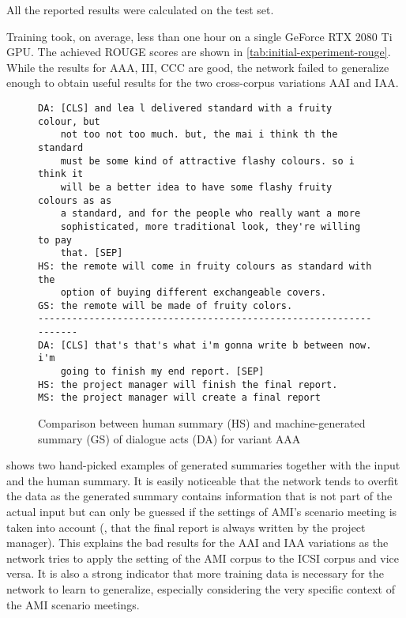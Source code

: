 All the reported results were calculated on the test set.

Training took, on average, less than one hour on a single GeForce RTX 2080 Ti GPU.
The achieved ROUGE scores are shown in \cref{tab:initial-experiment-rouge}.
While the results for AAA, III, CCC are good, the network failed to generalize enough to obtain useful results for the two cross-corpus variations AAI and IAA.

\begin{figure}[h]
\begin{lstlisting}[numbers=none]
DA: [CLS] and lea l delivered standard with a fruity colour, but
    not too not too much. but, the mai i think th the standard
    must be some kind of attractive flashy colours. so i think it
    will be a better idea to have some flashy fruity colours as as
    a standard, and for the people who really want a more
    sophisticated, more traditional look, they're willing to pay
    that. [SEP]
HS: the remote will come in fruity colours as standard with the
    option of buying different exchangeable covers.
GS: the remote will be made of fruity colors.
------------------------------------------------------------------
DA: [CLS] that's that's what i'm gonna write b between now. i'm
    going to finish my end report. [SEP]
HS: the project manager will finish the final report.
MS: the project manager will create a final report
\end{lstlisting}
\caption{Comparison between human summary (HS) and machine-generated summary (GS) of dialogue acts (DA) for variant AAA}
\label{fig:initial-experiment-example}
\end{figure}

 shows two hand-picked examples of generated summaries together with the input and the human summary.
It is easily noticeable that the network tends to overfit the data as the generated summary contains information that is not part of the actual input but can only be guessed if the settings of AMI's scenario meeting is taken into account (\eg, that the final report is always written by the project manager).
This explains the bad results for the AAI and IAA variations as the network tries to apply the setting of the AMI corpus to the ICSI corpus and vice versa.
It is also a strong indicator that more training data is necessary for the network to learn to generalize, especially considering the very specific context of the AMI scenario meetings.

